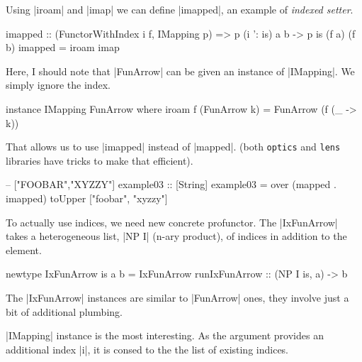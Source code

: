 Using |iroam| and |imap| we can define |imapped|,
an example of \emph{indexed setter}.

\begin{code}
imapped :: (FunctorWithIndex i f, IMapping p)
        => p (i ': is) a b -> p is (f a) (f b)
imapped = iroam imap
\end{code}

Here, I should note that |FunArrow| can be given an instance of |IMapping|.
We simply ignore the index.

\begin{code}
instance IMapping FunArrow where
    iroam f (FunArrow k) = FunArrow (f (\_ -> k))
\end{code}

That allows us to use |imapped| instead of |mapped|.
(both \texttt{optics} and \texttt{lens} libraries have tricks to make that efficient).

\begin{code}
-- ["FOOBAR","XYZZY"]
example03 :: [String]
example03 = over (mapped . imapped) toUpper ["foobar", "xyzzy"]
\end{code}

To actually use indices, we need new concrete profunctor.
The |IxFunArrow| takes a heterogeneous list, |NP I| (n-ary product),
of indices in addition to the element.

\begin{code}
newtype IxFunArrow is a b =
    IxFunArrow { runIxFunArrow :: (NP I is, a) -> b }
\end{code}

The |IxFunArrow| instances are similar to |FunArrow| ones,
they involve just a bit of additional plumbing.

    
|IMapping| instance is the most interesting.
As the argument provides an additional index |i|,
it is consed to the the list of existing indices.


